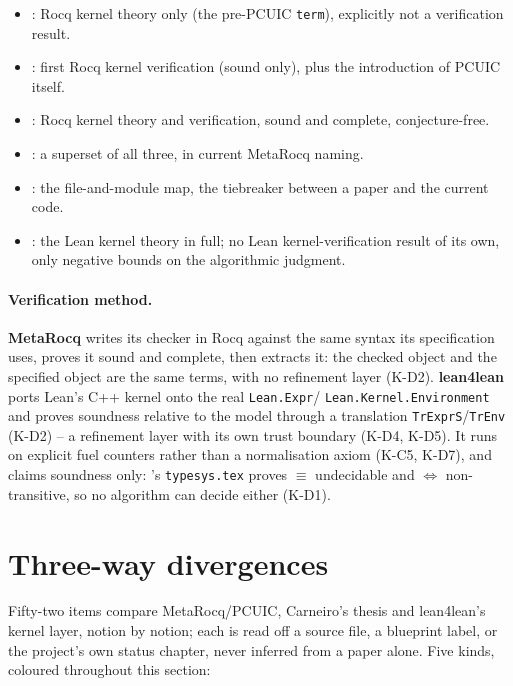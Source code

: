 \begin{itemize}
\item {}: Rocq kernel theory only (the pre-PCUIC \texttt{term}), explicitly not a verification
result.
\item {}: first Rocq kernel verification (sound only), plus the introduction of PCUIC itself.
\item {}: Rocq kernel theory and verification, sound and complete, conjecture-free.
\item {}: a superset of all three, in current MetaRocq naming.
\item {}: the file-and-module map, the tiebreaker between a paper and the current code.
\item {}: the Lean kernel theory in full; no Lean kernel-verification result of its own, only
negative bounds on the algorithmic judgment.
\end{itemize}
\paragraph{Verification method.} \textbf{MetaRocq} writes its checker in Rocq against the same
syntax its specification uses, proves it sound and complete, then extracts it: the checked
object and the specified object are the same terms, with no refinement layer (K-D2).
\textbf{lean4lean} ports Lean's C++ kernel onto the real \texttt{Lean.Expr}/
\texttt{Lean.Kernel.Environment} and proves soundness relative to the model through a
translation \texttt{TrExprS}/\texttt{TrEnv} (K-D2) -- a refinement layer with its own trust
boundary (K-D4, K-D5). It runs on explicit fuel counters rather than a normalisation axiom
(K-C5, K-D7), and claims soundness only: 's \texttt{typesys.tex} proves $\equiv$
undecidable and $\Leftrightarrow$ non-transitive, so no algorithm can decide either (K-D1).

\section{Three-way divergences}
\label{sec:ref-divergences}

Fifty-two items compare MetaRocq/PCUIC, Carneiro's thesis and lean4lean's kernel layer, notion by
notion; each is read off a source file, a blueprint label, or the project's own status chapter,
never inferred from a paper alone. Five kinds, coloured throughout this section:

